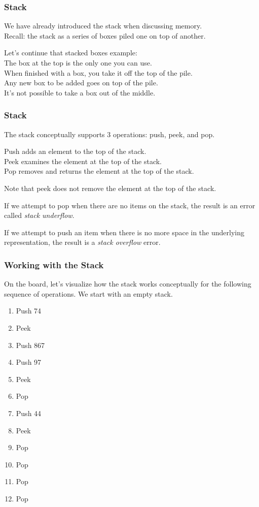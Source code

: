 \begin{frame}
\frametitle{Stack}
We have already introduced the stack when discussing memory.\\
Recall: the stack as a series of boxes piled one on top of another.

Let's continue that stacked boxes example:\\
\quad The box at the top is the only one you can use.\\
\quad When finished with a box, you take it off the top of the pile.\\
\quad Any new box to be added goes on top of the pile.\\
\quad It's not possible to take a box out of the middle.

\end{frame}


\begin{frame}
\frametitle{Stack}

The stack conceptually supports 3 operations: \alert{push}, \alert{peek}, and \alert{pop}.

Push adds an element to the top of the stack.\\
Peek examines the element at the top of the stack.\\
Pop removes and returns the element at the top of the stack.

Note that peek does not remove the element at the top of the stack.

If we attempt to pop when there are no items on the stack, the result is an error called \textit{stack underflow}.

If we attempt to push an item when there is no more space in the underlying representation, the result is a \textit{stack overflow} error.

\end{frame}

\begin{frame}
\frametitle{Working with the Stack}
On the board, let's visualize how the stack works conceptually for the following sequence of operations. We start with an empty stack.

\begin{enumerate}
	\item Push 74
	\item Peek
	\item Push 867
	\item Push 97
	\item Peek
	\item Pop
	\item Push 44
	\item Peek
	\item Pop
	\item Pop
	\item Pop
	\item Pop
\end{enumerate}


\end{frame}


